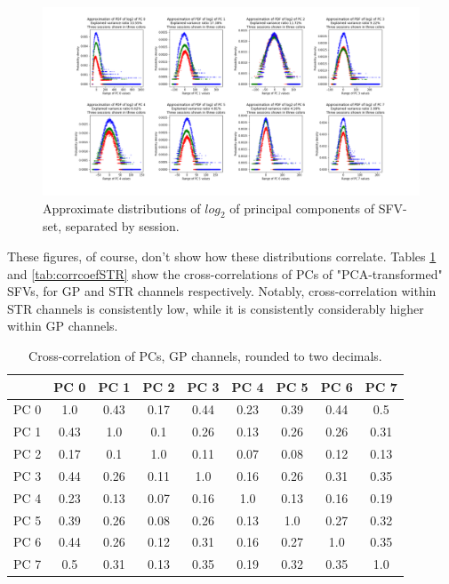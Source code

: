\documentclass{article}
\begin{document}
\begin{figure}[H]
    \centering
    \centerline{\includegraphics[width=1\textwidth]{images/PCA/PCAAnimalslg2.png}}
    \caption{Approximate distributions of \begin{math}log_2\end{math} of principal components of SFV-set, separated by session.}
    \label{fig:PCAAnimalslg2}
\end{figure}

These figures, of course, don't show how these distributions correlate.
Tables \ref{tab:corrcoefGP} and \ref{tab:corrcoefSTR} show the cross-correlations of PCs of "PCA-transformed" SFVs, for GP and STR channels respectively.
Notably, cross-correlation within STR channels is consistently low, while it is consistently considerably higher within GP channels.

\begin{table}[H]
    \centering
    \begin{tabular}{|c|c|c|c|c|c|c|c|c|}
    \hline
          & PC 0 & PC 1 & PC 2 & PC 3  & PC 4 & PC 5 & PC 6 & PC 7 \\ \hline
     PC 0 & 1.0  & 0.43 & 0.17 & 0.44  & 0.23 & 0.39 & 0.44 & 0.5  \\ \hline
     PC 1 & 0.43 & 1.0  & 0.1  & 0.26  & 0.13 & 0.26 & 0.26 & 0.31 \\ \hline
     PC 2 & 0.17 & 0.1  & 1.0  & 0.11  & 0.07 & 0.08 & 0.12 & 0.13 \\ \hline
     PC 3 & 0.44 & 0.26 & 0.11 & 1.0   & 0.16 & 0.26 & 0.31 & 0.35 \\ \hline
     PC 4 & 0.23 & 0.13 & 0.07 & 0.16  & 1.0  & 0.13 & 0.16 & 0.19 \\ \hline
     PC 5 & 0.39 & 0.26 & 0.08 & 0.26  & 0.13 & 1.0  & 0.27 & 0.32 \\ \hline
     PC 6 & 0.44 & 0.26 & 0.12 & 0.31  & 0.16 & 0.27 & 1.0  & 0.35 \\ \hline
     PC 7 & 0.5  & 0.31 & 0.13 & 0.35  & 0.19 & 0.32 & 0.35 & 1.0  \\ \hline
    \end{tabular}
    \caption{Cross-correlation of PCs, GP channels, rounded to two decimals.}
    \label{tab:corrcoefGP}
\end{table}
\end{document}
